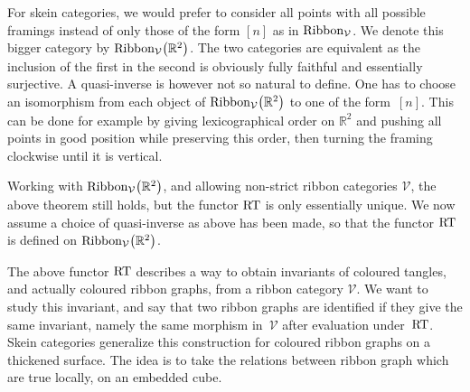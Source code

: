 \begin{Remark}\label{rmkEqCatSkR2VV}
For skein categories, we would prefer to consider all points with all possible framings instead of only those of the form $[n]$ as in ${\rm Ribbon}_\mathcal{V}$. We denote this bigger category by ${\rm Ribbon}_\mathcal{V}\big(\mathbb{R}^2\big)$. The two categories are equivalent as the inclusion of the first in the second is obviously fully faithful and essentially surjective. A quasi-inverse is however not so natural to define. One has to choose an isomorphism from each object of ${\rm Ribbon}_\mathcal{V}\big(\mathbb{R}^2\big)$ to one of the form~$[n]$. This can be done for example by giving lexicographical order on $\mathbb{R}^2$ and pushing all points in good position while preserving this order, then turning the framing clockwise until it is vertical.

Working with ${\rm Ribbon}_\mathcal{V}\big(\mathbb{R}^2\big)$, and allowing non-strict ribbon categories $\mathcal{V}$, the above theorem still holds, but the functor ${\rm RT}$ is only essentially unique. We now assume a choice of quasi-inverse as above has been made, so that the functor ${\rm RT}$ is defined on ${\rm Ribbon}_\mathcal{V}\big(\mathbb{R}^2\big)$.
\end{Remark}

The above functor ${\rm RT}$ describes a way to obtain invariants of coloured tangles, and actually coloured ribbon graphs, from a ribbon category $\mathcal{V}$. We want to study this invariant, and say that two ribbon graphs are identified if they give the same invariant, namely the same morphism in~$\mathcal{V}$ after evaluation under~${\rm RT}$. Skein categories generalize this construction for coloured ribbon graphs on a thickened surface. The idea is to take the relations between ribbon graph which are true locally, on an embedded cube.


